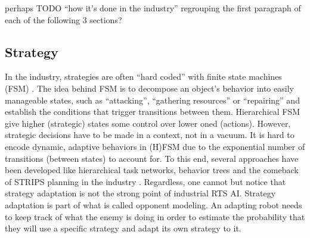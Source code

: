 \documentclass[journal]{IEEEtran}
\begin{document}
{\color{blue}
perhaps TODO ``how it's done in the industry'' regrouping the first paragraph of each of the following 3 sections?
}

\subsection{Strategy}

In the industry, strategies are often ``hard coded'' with finite state machines (FSM) \cite{FSM_AIGameProgWisdom2003}. The idea behind FSM is to decompose an object's behavior into easily manageable states, such as ``attacking'', ``gathering resources'' or ``repairing'' and establish the conditions that trigger transitions between them. Hierarchical FSM give higher (strategic) states some control over lower oned (actions). However, strategic decisions have to be made in a context, not in a vacuum. It is hard to encode dynamic, adaptive behaviors in (H)FSM due to the exponential number of transitions (between states) to account for. To this end, several approaches have been developed like hierarchical task networks, behavior trees and the comeback of STRIPS \cite{FikesSTRIPS} planning in the industry \cite{orkinGDC_FEAR}. Regardless, one cannot but notice that strategy adaptation is not the strong point of industrial RTS AI. Strategy adaptation is part of what is called opponent modeling. An adapting robot needs to keep track of what the enemy is doing in order to estimate the probability that they will use a specific strategy and adapt its own strategy to it. 
\end{document}
